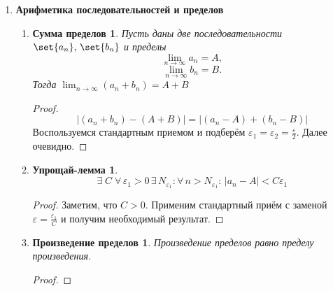 \documentclass{article}
\theoremstyle{plain}
\def\letus{%
    \mathord{\setbox0=\hbox{$\exists$}%
             \hbox{\kern 0.125\wd0%
                   \vbox to \ht0{%
                      \hrule width 0.75\wd0%
                      \vfill%
                      \hrule width 0.75\wd0}%
                   \vrule height \ht0%
                   \kern 0.125\wd0}%
           }%
}
\begin{document}
\begin{enumerate}
\begin{enumerate}
\begin{theorema*}
        Любая б. б. п. является неограниченной.
        \end{theorema*}
        \begin{proof}
        $\letus\; \set{{x_n}}$ - ограничена. $\exists\, C > 0: \forall\,n\in\mathbb{N}\rightarrow |x_n| < C$
        $$ \lim_{n \to \infty}{x_n} = \infty \iff \forall\,\varepsilon > 0\, \exists\; N\in \mathbb{N}: \forall\, n > N\rightarrow |x_n| > \frac{1}{\varepsilon}.$$ Но при $\varepsilon = \frac{1}{C}$ -- неверно. Противоречие.
        \end{proof}
        \end{enumerate}
        \item \textbf{Арифметика последовательностей и пределов}
        \begin{enumerate}
            \item \newtheorem{theorem11*}{Сумма пределов}
            \begin{theorem11*}
            Пусть даны две последовательности $\set{{a_n}},\,\set{{b_n}}$ и пределы $$ \lim_{n \to \infty}{a_n} = A,$$
            $$\lim_{n \to \infty}{b_n} = B.$$
            Тогда $\lim_{n \to \infty}{(a_n + b_n)} = A + B$
            \end{theorem11*}
            \begin{proof}
                    $$|(a_n + b_n) - (A + B)| = |(a_n - A) + (b_n - B)|$$
                    Воспользуемся стандартным приемом и подберём $\varepsilon_1 = \varepsilon_2 = \frac{\varepsilon}{2}$. Далее очевидно.
            \end{proof}
            \item \newtheorem*{helplemma1*}{Упрощай-лемма}
            \begin{helplemma1*}
                    $$\exists\; C\;\forall\,\varepsilon_1 > 0 \, \exists\,N_{\varepsilon_1}: \forall\,n > N_{\varepsilon_1}:\, |a_n - A| < C\varepsilon_1$$
            \end{helplemma1*}
            \begin{proof}
                    Заметим, что $C > 0$. Применим стандартный приём с заменой $\varepsilon = \frac{\varepsilon_1}{C}$ и получим необходимый результат.
            \end{proof}
            \item \newtheorem*{theorem12*}{Произведение пределов}
            \begin{theorem12*}
            Произведение пределов равно пределу произведения. 
            \end{theorem12*}
            \begin{proof}

\end{proof}
\end{enumerate}
\end{enumerate}
\end{document}
